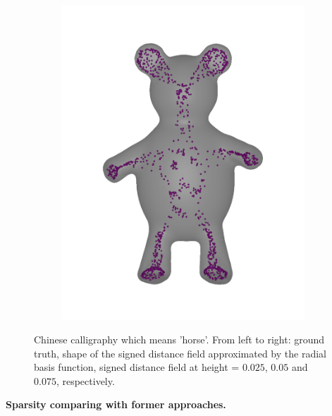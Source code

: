 \documentclass[annual]{acmsiggraph}
\begin{document}
\begin{figure}
\begin{subfigure}[b]{0.19\linewidth}
                \includegraphics[width=\textwidth]{images/bear/4.pdf}
        \end{subfigure}
        \caption{Chinese calligraphy which means 'horse'. From left to right: ground truth, shape of the signed distance field approximated by the radial basis function, signed distance field at height = $0.025$, $0.05$ and $0.075$, respectively. }
				\label{fig:horse}
\end{figure}



\textbf{Sparsity comparing with former approaches. }
\end{document}
